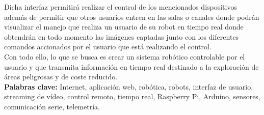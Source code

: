 Dicha interfaz permitirá realizar el control de los mencionados dispositivos además de permitir que otros usuarios entren en las salas o canales donde podrán visualizar el manejo 
que realiza un usuario de su robot en tiempo real donde obtendrán en todo momento las imágenes captadas junto con los diferentes comandos accionados por el usuario 
que está realizando el control.\\

Con todo ello, lo que se busca es crear un sistema robótico controlable por el usuario y que transmita información en tiempo real destinado a la exploración de áreas peligrosas y 
de coste reducido.\\

\textbf{Palabras clave:} Internet, aplicación web, robótica, robots, interfaz de usuario, streaming de vídeo, control remoto, tiempo real, Raspberry Pi, Arduino, sensores, comunicación serie,
telemetría.\\
